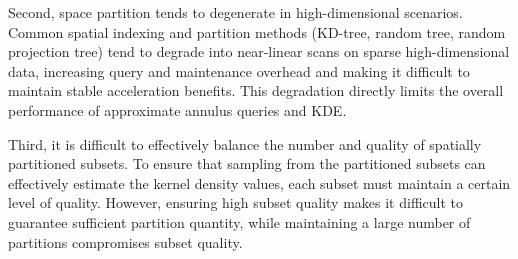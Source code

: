 \documentclass[conference]{IEEEtran}
\begin{document}
Second, space partition tends to degenerate in high-dimensional scenarios.
Common spatial indexing and partition methods (KD-tree, random tree, random projection tree) tend to degrade into near-linear scans on sparse high-dimensional data, increasing query and maintenance overhead and making it difficult to maintain stable acceleration benefits. This degradation directly limits the overall performance of approximate annulus queries and KDE.

Third, it is difficult to effectively balance the number and quality of spatially partitioned subsets.
To ensure that sampling from the partitioned subsets can effectively estimate the kernel density values, each subset must maintain a certain level of quality.
However, ensuring high subset quality makes it difficult to guarantee sufficient partition quantity, while maintaining a large number of partitions compromises subset quality.
\end{document}
